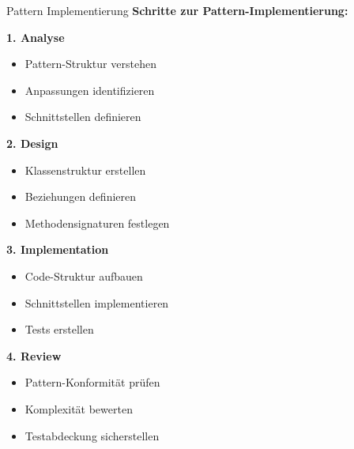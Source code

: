 \begin{KR}{Pattern Implementierung}
\textbf{Schritte zur Pattern-Implementierung:}

\textbf{1. Analyse}
\begin{itemize}
   \item Pattern-Struktur verstehen
   \item Anpassungen identifizieren
   \item Schnittstellen definieren
\end{itemize}

\textbf{2. Design}
\begin{itemize}
   \item Klassenstruktur erstellen
   \item Beziehungen definieren
   \item Methodensignaturen festlegen
\end{itemize}

\textbf{3. Implementation}
\begin{itemize}
   \item Code-Struktur aufbauen
   \item Schnittstellen implementieren
   \item Tests erstellen
\end{itemize}

\textbf{4. Review}
\begin{itemize}
   \item Pattern-Konformität prüfen
   \item Komplexität bewerten
   \item Testabdeckung sicherstellen
\end{itemize}
\end{KR}

